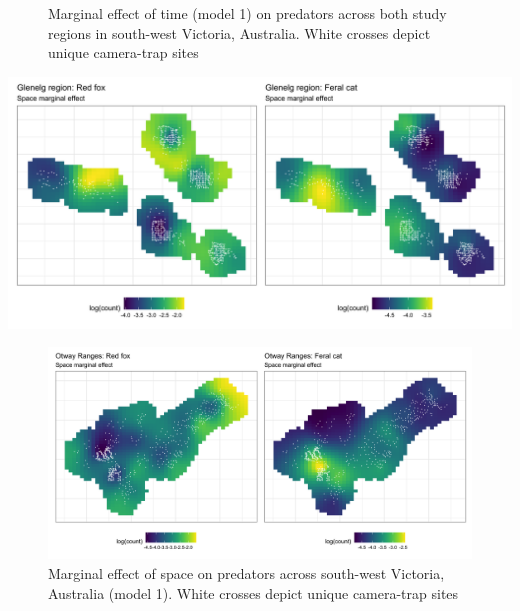 \documentclass[11pt,a4paper,titlepage,twoside,openright]{style/unimelbthesis}
\begin{document}
\begin{mainmatter}
\begin{figure}
\caption{Marginal effect of time (model 1) on predators across both study regions in south-west Victoria, Australia. White crosses depict unique camera-trap sites}\label{fig:diel-space-time-marginal}
\end{figure}
\newpage
\begin{center}\includegraphics[width=1\linewidth]{figure/sp_marginal_g} \end{center}
\begin{figure}

{\centering \includegraphics[width=1\linewidth]{figure/sp_marginal_o} 

}

\caption{Marginal effect of space on predators across south-west Victoria, Australia (model 1). White crosses depict unique camera-trap sites}\label{fig:diel-space-time-marginal-o}
\end{figure}
\newpage
\begin{figure}


\end{figure}
\end{mainmatter}
\end{document}
